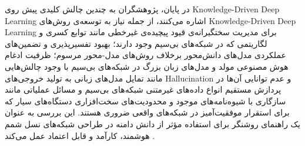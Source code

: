 در پایان، پژوهشگران به چندین چالش کلیدی پیش روی 
\gls{Knowledge-Driven Deep Learning}
 اشاره می‌کنند، از جمله نیاز به توسعه‌ی روش‌های 
\gls{Knowledge-Driven Deep Learning}
  برای مدیریت سختگیرانه‌ی قیود پیچیده‌ی غیرخطی مانند توابع کسری و لگاریتمی که در شبکه‌های بی‌سیم وجود دارند؛ بهبود تفسیرپذیری و تضمین‌های عملکردی مدل‌های دانش‌محور برخلاف روش‌های مدل-محور مرسوم؛ ظرفیت ادغام هوش مصنوعی مولد و مدل‌های زبان بزرگ در شبکه‌های بی‌سیم با وجود چالش‌هایی مانند تمایل مدل‌های زبانی به تولید خروجی‌های
\gls{Hallucination}
   و عدم توانایی آن‌ها در پردازش مستقیم انواع داده‌های غیرمتنی شبکه‌های بی‌سیم و مسائل عملیاتی مانند سازگاری با شیوه‌نامه‌های موجود و محدودیت‌های سخت‌افزاری دستگاه‌های سیار که برای استقرار موفقیت‌آمیز در شبکه‌های واقعی ضروری هستند. این بررسی به عنوان یک راهنمای روشنگر برای استفاده مؤثر از دانش دامنه در طراحی شبکه‌های نسل شمم هوشمند، کارآمد و قابل اعتماد عمل می‌کند
\cite{ComprehensiveSurvey}.

